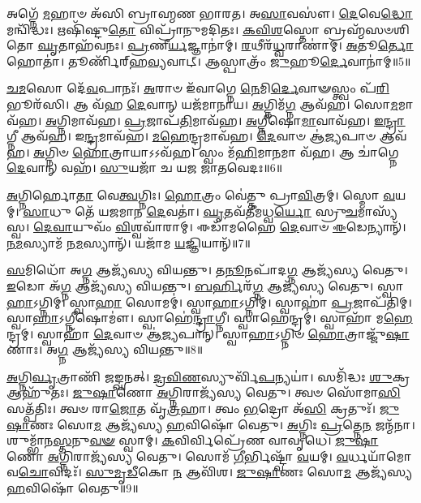 𑌅𑌗𑍍𑌨𑍇᳴ \ul{𑌮}\-𑌹𑌾𑍞 𑌅᳴𑌸𑌿 𑌬𑍍𑌰𑌾𑌹𑍍𑌮𑌣 𑌭𑌾𑌰𑌤।
𑌅\-\ul{𑌸𑌾}\-𑌵𑌸𑍗॑।
\-\ul{𑌦𑍇}\-𑌵𑍇\-\ul{𑌦𑍍𑌧𑍋} 𑌮𑌨𑍍𑌵𑌿᳴𑌦𑍍𑌧𑌃।
𑌋𑌷𑌿᳴𑌷𑍍𑌟𑍁\-\ul{𑌤𑍋} 𑌵𑌿𑌪𑍍𑌰𑌾᳴𑌨𑍁𑌮𑌦𑌿𑌤𑌃।
\-\ul{𑌕}\-\-\ul{𑌵𑌿}\-\-\ul{𑌶}\-𑌸𑍍𑌤𑍋 𑌬𑍍𑌰𑌹𑍍𑌮᳴𑌸𑍞𑌶𑌿𑌤𑍋 \ul{𑌘𑍃}\-𑌤𑌾𑌹᳴𑌵𑌨𑌃।
\-\ul{𑌪𑍍𑌰}\-𑌣𑍀\-\ul{𑌰𑍍𑌯}\-𑌜𑍍𑌞𑌾𑌨𑌾॑𑌮𑍍।
\-\ul{𑌰}\-𑌥𑍀𑌰᳴\-\ul{𑌧𑍍𑌵}\-𑌰𑌾𑌣𑌾॑𑌮𑍍।
\-\ul{𑌅}\-𑌤𑍂\-\ul{𑌰𑍍𑌤𑍋} 𑌹𑍋𑌤𑌾॑।
𑌤𑍂𑌰𑍍𑌣𑌿᳴𑌰𑍍‌\mbox{}𑌹\-\ul{𑌵𑍍𑌯}\-𑌵𑌾𑌟𑍍।
𑌆𑌸𑍍𑌪𑌾𑌤𑍍𑌰𑌂᳴ \ul{𑌜𑍁}\-𑌹𑍂\-\ul{𑌰𑍍𑌦𑍇}\-𑌵𑌾𑌨𑌾॑𑌮𑍍॥5॥

\-\ul{𑌚}\-\-\ul{𑌮}\-𑌸𑍋 𑌦𑍇᳴\-\ul{𑌵}\-𑌪𑌾𑌨𑌃᳴।
\-\ul{𑌅}\-𑌰𑌾𑍞 𑌇᳴𑌵𑌾𑌗𑍍𑌨𑍇 \ul{𑌨𑍇}\-𑌮𑌿\-\ul{𑌰𑍍𑌦𑍇}\-𑌵𑌾𑍟𑌸𑍍𑌤𑍍𑌵𑌂 𑌪᳴\-\ul{𑌰𑌿}\-𑌭𑍂𑌰᳴𑌸𑌿।
𑌆 𑌵᳴𑌹 \ul{𑌦𑍇}\-𑌵𑌾𑌨𑍍 𑌯𑌜᳴𑌮𑌾𑌨𑌾𑌯।
\-\ul{𑌅}\-𑌗𑍍𑌨𑌿𑌮᳴\-\ul{𑌗𑍍𑌨} 𑌆𑌵᳴𑌹।
𑌸𑍋\-\ul{𑌮}\-𑌮𑌾𑌵᳴𑌹।
\-\ul{𑌅}\-𑌗𑍍𑌨𑌿𑌮𑌾𑌵᳴𑌹।
\-\ul{𑌪𑍍𑌰}\-𑌜𑌾𑌪᳴\-\ul{𑌤𑌿}\-𑌮𑌾𑌵᳴𑌹।
\-\ul{𑌅}\-𑌗𑍍𑌨𑍀𑌷𑍋\-\ul{𑌮𑌾}\-𑌵𑌾𑌵᳴𑌹।
\-\ul{𑌇}\-\-\ul{𑌨𑍍𑌦𑍍𑌰𑌾}\-𑌗𑍍𑌨𑍀 𑌆𑌵᳴𑌹।
𑌇\-\ul{𑌨𑍍𑌦𑍍𑌰}\-𑌮𑌾𑌵᳴𑌹।
\-\ul{𑌮}\-\-\ul{𑌹𑍇}\-𑌨𑍍𑌦𑍍𑌰𑌮𑌾𑌵᳴𑌹।
\-\ul{𑌦𑍇}\-𑌵𑌾𑍞 𑌆॑\-\ul{𑌜𑍍𑌯}\-𑌪𑌾𑍞 𑌆𑌵᳴𑌹।
\-\ul{𑌅}\-𑌗𑍍𑌨𑌿𑍞 \ul{𑌹𑍋}\-𑌤𑍍𑌰𑌾𑌯𑌾𑌽𑌽𑌵᳴𑌹।
𑌸𑍍𑌵𑌂 𑌮᳴\-\ul{𑌹𑌿}\-𑌮𑌾\-\ul{𑌨}\-𑌮𑌾 𑌵᳴𑌹।
𑌆 𑌚𑌾॑𑌗𑍍𑌨𑍇 \ul{𑌦𑍇}\-𑌵𑌾𑌨𑍍 𑌵𑌹᳴।
\-\ul{𑌸𑍁}\-𑌯𑌜𑌾᳴ 𑌚 𑌯𑌜 𑌜𑌾𑌤𑌵𑍇𑌦𑌃॥6॥\anuvakamend[\-\ul{𑌦𑍇}\-𑌵𑌾\-\ul{𑌨𑌾}\-𑌮𑌿\-\ul{𑌨𑍍𑌦𑍍𑌰}\-𑌮𑌾 𑌵᳴\-\ul{𑌹} 𑌷𑌟𑍍 𑌚᳴]

\-\ul{𑌅}\-𑌗𑍍𑌨𑌿𑌰𑍍\mbox{}𑌹𑍋\-\ul{𑌤𑌾} 𑌵𑍇\-\ul{𑌤𑍍𑌵}\-𑌗𑍍𑌨𑌿𑌃।
\-\ul{𑌹𑍋}\-𑌤𑍍𑌰𑌂 𑌵𑍇॑𑌤𑍍𑌤𑍁 𑌪𑍍𑌰𑌾\-\ul{𑌵𑌿}\-𑌤𑍍𑌰𑌮𑍍।
𑌸𑍍𑌮𑍋 \ul{𑌵}\-𑌯𑌮𑍍।
\-\ul{𑌸𑌾}\-𑌧𑍁 𑌤𑍇᳴ 𑌯𑌜𑌮𑌾𑌨 \ul{𑌦𑍇}\-𑌵𑌤𑌾॑।
\-\ul{𑌘𑍃}\-𑌤𑌵᳴𑌤𑍀𑌮𑌧𑍍𑌵\-\ul{𑌰𑍍𑌯𑍋} 𑌸𑍍𑌰𑍁\-\ul{𑌚}\-𑌮𑌾𑌸𑍍𑌯᳴𑌸𑍍𑌵।
\-\ul{𑌦𑍇}\-\-\ul{𑌵𑌾}\-𑌯𑍁𑌵𑌂᳴ \ul{𑌵𑌿}\-𑌶𑍍𑌵𑌵𑌾᳴𑌰𑌾𑌮𑍍।
𑌈𑌡𑌾᳴𑌮𑌹𑍈 \ul{𑌦𑍇}\-𑌵𑌾𑍞 \ul{𑌈}\-𑌡𑍇𑌨𑍍𑌯𑌾𑌨𑍍᳴।
\-\ul{𑌨}\-\-\ul{𑌮}\-𑌸𑍍𑌯𑌾𑌮᳴ 𑌨\-\ul{𑌮}\-𑌸𑍍𑌯𑌾𑌨𑍍᳴।
𑌯𑌜𑌾᳴𑌮 \ul{𑌯}\-𑌜𑍍𑌞𑌿𑌯𑌾𑌨𑍍᳴॥7॥\anuvakamend[\-\ul{𑌅}\-𑌗𑍍𑌨𑌿𑌰𑍍‌\mbox{}𑌹𑍋\-\ul{𑌤𑌾} 𑌨𑌵᳴]

\-\ul{𑌸}\-𑌮𑌿𑌧𑍋᳴ 𑌅\-\ul{𑌗𑍍𑌨} 𑌆𑌜𑍍𑌯᳴𑌸𑍍𑌯 𑌵𑌿𑌯𑌨𑍍𑌤𑍁।
𑌤\-\ul{𑌨𑍂}\-𑌨𑌪𑌾᳴𑌦\-\ul{𑌗𑍍𑌨} 𑌆𑌜𑍍𑌯᳴𑌸𑍍𑌯 𑌵𑍇𑌤𑍁।
\-\ul{𑌇}\-𑌡𑍋 𑌅᳴\-\ul{𑌗𑍍𑌨} 𑌆𑌜𑍍𑌯᳴𑌸𑍍𑌯 𑌵𑌿𑌯𑌨𑍍𑌤𑍁।
\-\ul{𑌬}\-\-\ul{𑌰𑍍}\-𑌹𑌿𑌰᳴\-\ul{𑌗𑍍𑌨} 𑌆𑌜𑍍𑌯᳴𑌸𑍍𑌯 𑌵𑍇𑌤𑍁।
𑌸𑍍𑌵𑌾\-\ul{𑌹𑌾}\-\-𑌽𑌗𑍍𑌨𑌿𑌮𑍍।
𑌸𑍍𑌵𑌾\-\ul{𑌹𑌾} 𑌸𑍋𑌮𑌮𑍍॑।
𑌸𑍍𑌵𑌾\-\ul{𑌹𑌾}\-\-𑌽𑌗𑍍𑌨𑌿𑌮𑍍।
𑌸𑍍𑌵𑌾𑌹𑌾॑ \ul{𑌪𑍍𑌰}\-𑌜𑌾𑌪᳴𑌤𑌿𑌮𑍍।
𑌸𑍍𑌵𑌾\-\ul{𑌹𑌾}\-\-𑌽𑌗𑍍𑌨𑍀𑌷𑍋𑌮𑍗॑।
𑌸𑍍𑌵𑌾𑌹𑍇॑\-\ul{𑌨𑍍𑌦𑍍𑌰𑌾}\-𑌗𑍍𑌨𑍀।
𑌸𑍍𑌵𑌾𑌹𑍇𑌨𑍍𑌦𑍍𑌰𑌮𑍍॑।
𑌸𑍍𑌵𑌾𑌹𑌾᳴ 𑌮\-\ul{𑌹𑍇}\-𑌨𑍍𑌦𑍍𑌰𑌮𑍍।
𑌸𑍍𑌵𑌾𑌹𑌾᳴ \ul{𑌦𑍇}\-𑌵𑌾𑍞 𑌆॑\-\ul{𑌜𑍍𑌯}\-𑌪𑌾𑌨𑍍।
𑌸𑍍𑌵𑌾\-\ul{𑌹𑌾}\-\-𑌽𑌗𑍍𑌨𑌿𑍞 \ul{𑌹𑍋}\-𑌤𑍍𑌰𑌾𑌜𑍍𑌜𑍁᳴\-\ul{𑌷𑌾}\-𑌣𑌾𑌃।
𑌅\-\ul{𑌗𑍍𑌨} 𑌆𑌜𑍍𑌯᳴𑌸𑍍𑌯 𑌵𑌿𑌯𑌨𑍍𑌤𑍁॥8॥\anuvakamend[\-\ul{𑌇}\-\-\ul{𑌨𑍍𑌦𑍍𑌰𑌾}\-𑌗𑍍𑌨𑍀 𑌪𑌞𑍍𑌚᳴ 𑌚]

\-\ul{𑌅}\-𑌗𑍍𑌨𑌿\-\ul{𑌰𑍍𑌵𑍃}\-𑌤𑍍𑌰𑌾𑌣𑌿᳴ 𑌜𑌙𑍍𑌘𑌨𑌤𑍍।
\-\ul{𑌦𑍍𑌰}\-\-\ul{𑌵𑌿}\-\-\ul{𑌣}\-𑌸𑍍𑌯𑍁𑌰𑍍𑌵𑌿᳴\-\ul{𑌪}\-𑌨𑍍𑌯𑌯𑌾॑।
𑌸𑌮𑌿᳴𑌦𑍍𑌧𑌃 \ul{𑌶𑍁}\-𑌕𑍍𑌰 𑌆𑌹𑍁᳴𑌤𑌃।
\-\ul{𑌜𑍁}\-\-\ul{𑌷𑌾}\-𑌣𑍋 \ul{𑌅}\-𑌗𑍍𑌨𑌿𑌰𑌾𑌜𑍍𑌯᳴𑌸𑍍𑌯 𑌵𑍇𑌤𑍁।
𑌤𑍍𑌵𑍞 𑌸𑍋᳴𑌮𑌾\-\ul{𑌸𑌿} 𑌸𑌤𑍍𑌪᳴𑌤𑌿𑌃।
𑌤𑍍𑌵𑍞 𑌰𑌾\-\ul{𑌜𑍋}\-𑌤 𑌵𑍃᳴\-\ul{𑌤𑍍𑌰}\-𑌹𑌾।
𑌤𑍍𑌵𑌂 \ul{𑌭}\-𑌦𑍍𑌰𑍋 𑌅᳴\-\ul{𑌸𑌿} 𑌕𑍍𑌰𑌤𑍁𑌃᳴।
\-\ul{𑌜𑍁}\-\-\ul{𑌷𑌾}\-𑌣𑌃 𑌸𑍋\-\ul{𑌮} 𑌆𑌜𑍍𑌯᳴𑌸𑍍𑌯 \ul{𑌹}\-𑌵𑌿𑌷𑍋᳴ 𑌵𑍇𑌤𑍁।
\-\ul{𑌅}\-𑌗𑍍𑌨𑌿𑌃 \ul{𑌪𑍍𑌰}\-𑌤𑍍𑌨𑍇\-\ul{𑌨} 𑌜𑌨𑍍𑌮᳴𑌨𑌾।
𑌶𑍁𑌮𑍍𑌭𑌾᳴𑌨\-\ul{𑌸𑍍𑌤}\-𑌨𑍁\-\ul{𑌵}\-\-\ul{𑍟} 𑌸𑍍𑌵𑌾𑌮𑍍।
\-\ul{𑌕}\-𑌵𑌿𑌰𑍍𑌵𑌿𑌪𑍍𑌰𑍇᳴𑌣 𑌵𑌾𑌵𑍃𑌧𑍇।
\-\ul{𑌜𑍁}\-\-\ul{𑌷𑌾}\-𑌣𑍋 \ul{𑌅}\-𑌗𑍍𑌨𑌿𑌰𑌾𑌜𑍍𑌯᳴𑌸𑍍𑌯 𑌵𑍇𑌤𑍁।
𑌸𑍋𑌮᳴ \ul{𑌗𑍀}\-𑌰𑍍𑌭𑌿𑌷𑍍𑌟𑍍𑌵𑌾᳴ \ul{𑌵}\-𑌯𑌮𑍍।
\-\ul{𑌵}\-𑌰𑍍𑌧𑌯𑌾᳴𑌮𑍋 𑌵\-\ul{𑌚𑍋}\-𑌵𑌿𑌦𑌃᳴।
\-\ul{𑌸𑍁}\-\-\ul{𑌮𑍃}\-\-\ul{𑌡𑍀}\-𑌕𑍋 \ul{𑌨} 𑌆𑌵𑌿᳴𑌶।
\-\ul{𑌜𑍁}\-\-\ul{𑌷𑌾}\-𑌣𑌃 𑌸𑍋\-\ul{𑌮} 𑌆𑌜𑍍𑌯᳴𑌸𑍍𑌯 \ul{𑌹}\-𑌵𑌿𑌷𑍋᳴ 𑌵𑍇𑌤𑍁॥9॥\anuvakamend[𑌸𑍍𑌵𑌾𑍞 𑌷𑌟𑍍 𑌚᳴]


